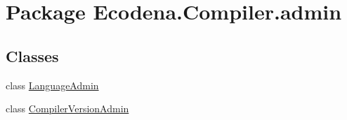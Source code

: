 \hypertarget{namespace_ecodena_1_1_compiler_1_1admin}{
\section{Package Ecodena.Compiler.admin}
\label{d8/deb/namespace_ecodena_1_1_compiler_1_1admin}
}
\subsection*{Classes}
\begin{DoxyCompactItemize}
\item 
class \hyperlink{class_ecodena_1_1_compiler_1_1admin_1_1_language_admin}{LanguageAdmin}
\item 
class \hyperlink{class_ecodena_1_1_compiler_1_1admin_1_1_compiler_version_admin}{CompilerVersionAdmin}
\end{DoxyCompactItemize}
